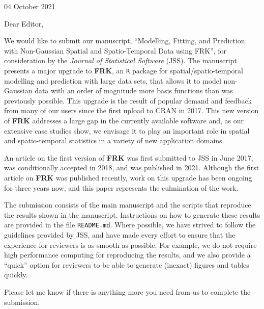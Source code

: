 \documentclass[english]{letter}
\begin{document}
\thispagestyle{empty}
04 October 2021

\vspace{0.5in}

Dear Editor,

\vspace{0.5cm}


We would like to submit our manuscript, ``Modelling, Fitting, and Prediction with Non-Gaussian Spatial and Spatio-Temporal Data using FRK'', for consideration by the \emph{Journal of Statistical Software} (JSS). The manuscript presents a major upgrade to \textbf{FRK}, an \texttt{R}  package for spatial/spatio-temporal modelling and prediction with large data sets, that allows it to model non-Gaussian data with an order of magnitude more basis functions than was previously possible. This upgrade is the result of popular demand and feedback from many of our users since the first upload to CRAN in 2017.  This new version of \textbf{FRK} addresses a large gap in the currently available software and, as our extensive case studies show, we envisage it to play an important role in spatial and spatio-temporal statistics in a variety of new application domains. 

An article on the first version of \textbf{FRK} was first submitted to JSS in June 2017, was conditionally accepted in 2018, and was published in 2021. Although the first article on \textbf{FRK} was published  recently, work on this upgrade has been ongoing for three years now, and this paper represents the culmination of the work. 

The submission consists of the main manuscript and the scripts that reproduce the results shown in the manuscript. Instructions on how to generate these results are provided in the file \texttt{README.md}. Where possible, we have strived to follow the guidelines provided by JSS, and have made every effort to ensure that the experience for reviewers is as smooth as possible. For example, we do not require high performance computing for reproducing the results, and we also provide a ``quick''  option for reviewers to be able to generate (inexact) figures and tables quickly.


Please let me know if there is anything more you need from us to complete the submission.
\end{document}
